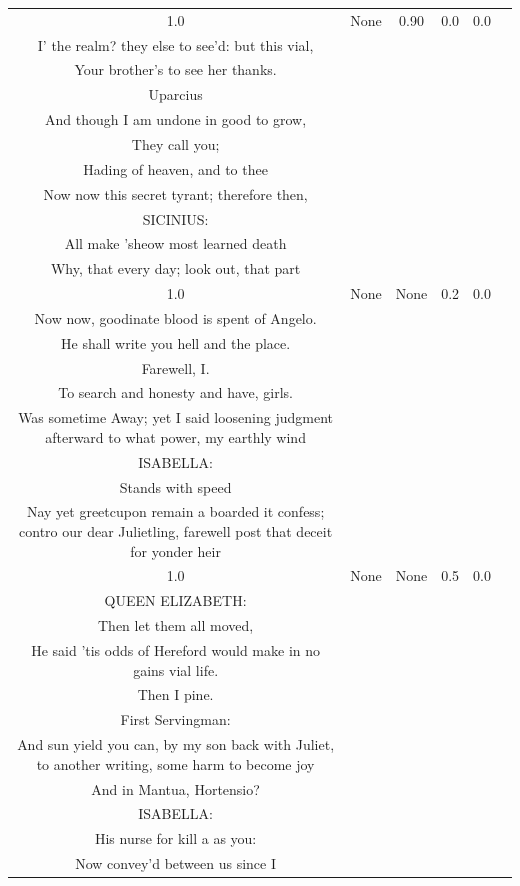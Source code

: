 \documentclass[11pt]{book}
\theoremstyle{plain}
\theoremstyle{definition}
\begin{document}
\begin{longtable}{ccccc >{\raggedright\arraybackslash}p{8cm}}
    1.0 & None & 0.90 & 0.0 & 0.0 &
    \begin{tcolorbox}[breakable, enhanced jigsaw, frame hidden, colback=white, boxrule=0pt]
    KING RICHARD:\\
    I' the realm? they else to see'd: but this vial,\\
    Your brother's to see her thanks.\\
    Uparcius\\
    And though I am undone in good to grow,\\
    They call you;\\
    Hading of heaven, and to thee\\
    Now now this secret tyrant; therefore then,\\
    SICINIUS:\\
    All make 'sheow most learned death\\
    Why, that every day; look out, that part
    \end{tcolorbox} \\
    
    1.0 & None & None & 0.2 & 0.0 &
    \begin{tcolorbox}[breakable, enhanced jigsaw, frame hidden, colback=white, boxrule=0pt]
    KING RICHARD:\\
    Now now, goodinate blood is spent of Angelo.\\
    He shall write you hell and the place.\\
    Farewell, I.\\
    To search and honesty and have, girls.\\
    Was sometime Away; yet I said loosening judgment afterward to what power, my earthly wind\\
    ISABELLA:\\
    Stands with speed\\
    Nay yet greetcupon remain a boarded it confess; contro our dear Julietling, farewell post that deceit for yonder heir
    \end{tcolorbox} \\
    
    1.0 & None & None & 0.5 & 0.0 &
    \begin{tcolorbox}[breakable, enhanced jigsaw, frame hidden, colback=white, boxrule=0pt]
    KING RICHARD:\\
    QUEEN ELIZABETH:\\
    Then let them all moved,\\
    He said 'tis odds of Hereford would make in no gains vial life.\\
    Then I pine.\\
    First Servingman:\\
    And sun yield you can, by my son back with Juliet, to another writing, some harm to become joy\\
    And in Mantua, Hortensio?\\
    ISABELLA:\\
    His nurse for kill a as you:\\
    Now convey'd between us since I
    \end{tcolorbox} \\
    

\end{longtable}
\end{document}
